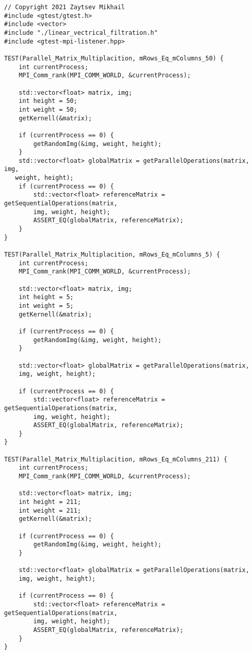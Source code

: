 \documentclass{report}
\begin{document}
\begin{lstlisting}
// Copyright 2021 Zaytsev Mikhail
#include <gtest/gtest.h>
#include <vector>
#include "./linear_vectrical_filtration.h"
#include <gtest-mpi-listener.hpp>

TEST(Parallel_Matrix_Multiplacition, mRows_Eq_mColumns_50) {
    int currentProcess;
    MPI_Comm_rank(MPI_COMM_WORLD, &currentProcess);

    std::vector<float> matrix, img;
    int height = 50;
    int weight = 50;
    getKernell(&matrix);

    if (currentProcess == 0) {
        getRandomImg(&img, weight, height);
    }
    std::vector<float> globalMatrix = getParallelOperations(matrix, img,
   weight, height);
    if (currentProcess == 0) {
        std::vector<float> referenceMatrix = getSequentialOperations(matrix,
        img, weight, height);
        ASSERT_EQ(globalMatrix, referenceMatrix);
    }
}

TEST(Parallel_Matrix_Multiplacition, mRows_Eq_mColumns_5) {
    int currentProcess;
    MPI_Comm_rank(MPI_COMM_WORLD, &currentProcess);

    std::vector<float> matrix, img;
    int height = 5;
    int weight = 5;
    getKernell(&matrix);

    if (currentProcess == 0) {
        getRandomImg(&img, weight, height);
    }

    std::vector<float> globalMatrix = getParallelOperations(matrix,
    img, weight, height);

    if (currentProcess == 0) {
        std::vector<float> referenceMatrix = getSequentialOperations(matrix,
        img, weight, height);
        ASSERT_EQ(globalMatrix, referenceMatrix);
    }
}

TEST(Parallel_Matrix_Multiplacition, mRows_Eq_mColumns_211) {
    int currentProcess;
    MPI_Comm_rank(MPI_COMM_WORLD, &currentProcess);

    std::vector<float> matrix, img;
    int height = 211;
    int weight = 211;
    getKernell(&matrix);

    if (currentProcess == 0) {
        getRandomImg(&img, weight, height);
    }

    std::vector<float> globalMatrix = getParallelOperations(matrix,
    img, weight, height);

    if (currentProcess == 0) {
        std::vector<float> referenceMatrix = getSequentialOperations(matrix,
        img, weight, height);
        ASSERT_EQ(globalMatrix, referenceMatrix);
    }
}


\end{lstlisting}
\end{document}
